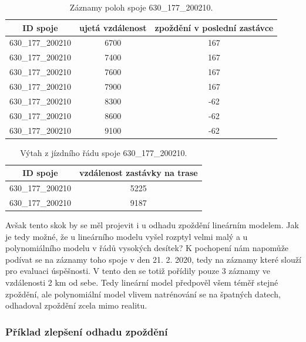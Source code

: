 \begin{center}
	\begin{table}[ht]
\centering
\begin{tabular}{|c|c|c|}
\hline
ID spoje & ujetá vzdálenost & zpoždění v poslední zastávce \\ \hline \hline
630\_177\_200210 & 6700 & 167 \\ \hline
630\_177\_200210 & 7400 & 167 \\ \hline
630\_177\_200210 & 7600 & 167 \\ \hline
630\_177\_200210 & 7900 & 167 \\ \hline
630\_177\_200210 & 8300 & -62 \\ \hline
630\_177\_200210 & 8600 & -62 \\ \hline
630\_177\_200210 & 9100 & -62 \\ \hline
\end{tabular}
\label{table:825_samples}
\caption{Záznamy poloh spoje 630\_177\_200210.}
\end{table}
\end{center}

\begin{center}
	\begin{table}[ht]
\centering
\begin{tabular}{|c|c|}
\hline
ID spoje & vzdálenost zastávky na trase \\ \hline \hline
630\_177\_200210 & 5225 \\ \hline
630\_177\_200210 & 9187 \\ \hline
\end{tabular}
\label{tab:825_ride}
\caption{Výtah z jízdního řádu spoje 630\_177\_200210.}
\end{table}
\end{center}

\bigbreak

Avšak tento skok by se měl projevit i u odhadu zpoždění lineárním modelem. Jak je tedy možné, že u lineárního modelu vyšel rozptyl velmi malý a u polynomiálního modelu v řádů vysokých desítek? K pochopení nám napomůže podívat se na záznamy toho spoje v den 21. 2. 2020, tedy na záznamy které slouží pro evaluaci úspěšnosti. V tento den se totiž pořídily pouze 3 záznamy ve vzdálenosti 2 km od sebe. Tedy lineární model předpověl všem téměř stejné zpoždění, ale polynomiální model vlivem natrénování se na špatných datech, odhadoval zpoždění zcela mimo realitu.

\subsubsection{Příklad zlepšení odhadu zpoždění}

